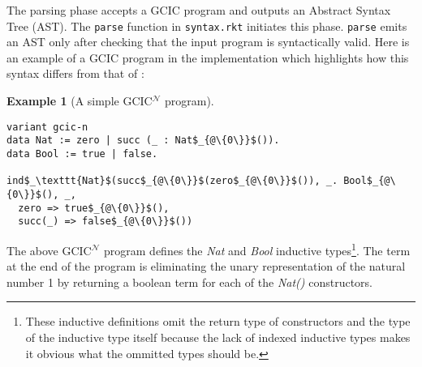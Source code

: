 \documentclass{article}
\theoremstyle{definition}
\newtheorem{example}[theorem]{Example}
\newcommand{\Gcode}[1]{{\color{OliveGreen}\textit{#1}}}
\newcommand{\Gcmath}[1]{{\color{OliveGreen}#1}}
\newcommand{\GCICN}[0]{GCIC\(^\mathcal{N}\)}
\begin{document}
The parsing phase accepts a GCIC program and outputs an Abstract Syntax Tree
(AST). The \texttt{parse} function in \texttt{syntax.rkt} initiates this phase.
\texttt{parse} emits an AST only after checking that the input program is
syntactically valid.
Here is an example of a GCIC program in the implementation which highlights how
this syntax differs from that of \citet{lennon-bertrand_gradualizing_2022}:
\begin{example}[A simple \GCICN{} program]
\label{ex:simple}\
\begin{lstlisting}[mathescape,language=GCIC]
variant gcic-n
data Nat := zero | succ (_ : Nat$_{@\{0\}}$()).
data Bool := true | false.

ind$_\texttt{Nat}$(succ$_{@\{0\}}$(zero$_{@\{0\}}$()), _. Bool$_{@\{0\}}$(), _,
  zero => true$_{@\{0\}}$(),
  succ(_) => false$_{@\{0\}}$())
\end{lstlisting}
\end{example}
\noindent The above \GCICN{} program defines the \Gcode{Nat} and \Gcode{Bool}
inductive types\footnote{These inductive definitions omit the return type of
constructors and the type of the inductive type itself because the lack of
indexed inductive types makes it obvious what the ommitted types should be.}.
The term at the end of the program is eliminating the unary representation of
the natural number 1 by returning a boolean term for each of the \Gcode{Nat()}
constructors.
\end{document}
